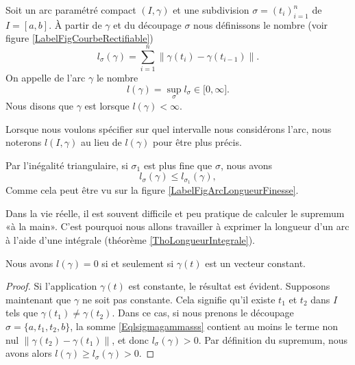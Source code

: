 \newcommand{\CaptionFigCourbeRectifiable}{La longueur d'un découpage. La somme des longueurs des segments droits est facile à calculer.}

\begin{definition}      \label{DEFooDNZWooXmxhsU}
    Soit un arc paramétré compact $(I,\gamma)$ et une subdivision $\sigma=(t_i)_{i=1}^n$ de $I=[a,b]$. À partir de $\gamma$ et du découpage $\sigma$ nous définissons le nombre (voir figure \ref{LabelFigCourbeRectifiable})
    \begin{equation}        \label{Eqlsigmagammasss}
        l_{\sigma}(\gamma)=\sum_{i=1}^n\big\| \gamma(t_i)-\gamma(t_{i-1}) \big\|.
    \end{equation}
    On appelle  de l'arc $\gamma$ le nombre
    \begin{equation}
        l(\gamma)=\sup_{\sigma}l_{\sigma}\in\mathopen[ 0 , \infty \mathclose].
    \end{equation}
    Nous disons que $\gamma$ est  lorsque $l(\gamma)<\infty$.
\end{definition}
Lorsque nous voulons spécifier sur quel intervalle nous considérons l'arc, nous noterons $l(I,\gamma)$ au lieu de $l(\gamma)$ pour être plus précis.

Par l'inégalité triangulaire, si $\sigma_1$ est plus fine que $\sigma$, nous avons
\begin{equation}
    l_{\sigma}(\gamma)\leq l_{\sigma_1}(\gamma),
\end{equation}
Comme cela peut être vu sur la figure \ref{LabelFigArcLongueurFinesse}.
\newcommand{\CaptionFigArcLongueurFinesse}{Il est visible que la longueur donnée par l'approximation par des petits segments (verts) est plus longue et plus précise que celle donnée par les longs segments (rouge).}


Dans la vie réelle, il est souvent difficile et peu pratique de calculer le supremum «à la main». C'est pourquoi nous allons travailler à exprimer la longueur d'un arc à l'aide d'une intégrale (théorème \ref{ThoLongueurIntegrale}).

\begin{lemma}
    Nous avons $l(\gamma)=0$ si et seulement si $\gamma(t)$ est un vecteur constant.
\end{lemma}

\begin{proof}
    Si l'application $\gamma(t)$ est constante, le résultat est évident. Supposons maintenant que $\gamma$ ne soit pas constante. Cela signifie qu'il existe $t_1$ et $t_2$ dans $I$ tels que $\gamma(t_1)\neq \gamma(t_2)$. Dans ce cas, si nous prenons le découpage $\sigma=\{ a,t_1,t_2,b \}$, la somme \eqref{Eqlsigmagammasss} contient au moins le terme non nul $\| \gamma(t_2)-\gamma(t_1) \|$, et donc $l_{\sigma}(\gamma)>0$. Par définition du supremum, nous avons alors $l(\gamma)\geq l_{\sigma}(\gamma)>0$.
\end{proof}

